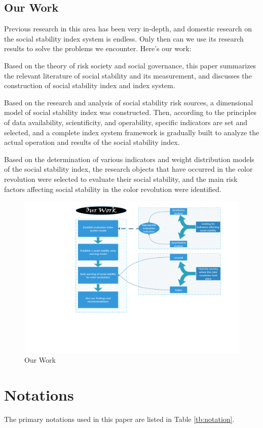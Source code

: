\documentclass[12pt]{article}  %
\begin{document}
\subsection{Our Work}
Previous research in this area has been very in-depth, and domestic research on the social stability index system is endless. Only then can we use its research results to solve the problems we encounter. Here's our work:

{\LARGE\CheckedBox} Based on the theory of risk society and social governance, this paper summarizes the relevant literature of social stability and its measurement, and discusses the construction of social stability index and index system. 

{\LARGE\CheckedBox} Based on the research and analysis of social stability risk sources, a dimensional model of social stability index was constructed. Then, according to the principles of data availability, scientificity, and operability, specific indicators are set and selected, and a complete index system framework is gradually built to analyze the actual operation and results of the social stability index.

{\LARGE\CheckedBox} Based on the determination of various indicators and weight distribution models of the social stability index, the research objects that have occurred in the color revolution were selected to evaluate their social stability, and the main risk factors affecting social stability in the color revolution were identified.
\begin{figure}[htbp]
\centering
\includegraphics[width=.4\textwidth]{img/our work.pdf}
\caption{Our Work}
\end{figure}
\section{Notations}
The primary notations used in this paper are listed in Table \ref{tb:notation}.
\end{document}
